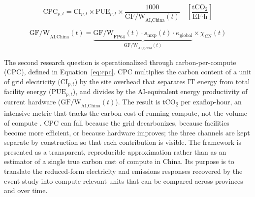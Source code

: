 \documentclass[12pt,a4paper]{article}
\begin{document}
\begin{equation}
\text{CPC}_{p,t}
= \text{CI}_{p,t} \times \text{PUE}_{p,t}
  \times \frac{1000}{\text{GF/W}_{\text{AI,China}}(t)}
\quad \left[\frac{\text{tCO}_2}{\text{EF}\cdot\text{h}}\right]
\label{eq:cpc}
\end{equation}


\begin{equation}
\text{GF/W}_{\text{AI,China}}(t)
= \underbrace{\text{GF/W}_{\text{FP64}}(t) \cdot s_{\text{mxp}}(t)
  \cdot \kappa_{\text{global}}}_{\text{GF/W}_{\text{AI,global}}(t)}
  \times \chi_{\text{CN}}(t)
\label{eq:gfw}
\end{equation}

%
%

The second research question is operationalized through
carbon-per-compute (CPC), defined in Equation~\eqref{eq:cpc}. CPC
multiplies the carbon content of a unit of grid electricity
($\text{CI}_{p,t}$) by the site overhead that separates IT energy
from total facility energy ($\text{PUE}_{p,t}$), and divides by the
AI-equivalent energy productivity of current hardware
($\text{GF/W}_{\text{AI,China}}(t)$). The result is
tCO\textsubscript{2} per exaflop-hour, an intensive metric that
tracks the carbon cost of running compute, not the volume of compute
\citep{guptaetal-2022-chasingcarbonelusive,
radovanovicetal-2023-carbonawarecomputingdatacenters}. CPC can fall
because the grid decarbonizes, because facilities become more
efficient, or because hardware improves; the three channels are kept
separate by construction so that each contribution is visible. The
framework is presented as a transparent, reproducible approximation
rather than as an estimator of a single true carbon cost of compute
in China. Its purpose is to translate the reduced-form electricity
and emissions responses recovered by the event study into
compute-relevant units that can be compared across provinces and
over time.
\end{document}
